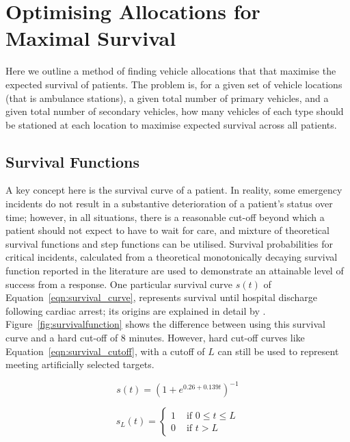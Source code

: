 \documentclass[preprint,12pt]{elsarticle}
\begin{document}
\section{Optimising Allocations for Maximal Survival}\label{sec:optimising}
Here we outline a method of finding vehicle allocations that that maximise the
expected survival of patients.
The problem is, for a given set of vehicle locations (that is ambulance
stations), a given total number of primary vehicles, and a given total number
of secondary vehicles, how many vehicles of each type should be stationed at
each location to maximise expected survival across all patients.


\subsection{Survival Functions}\label{sec:survival}
A key concept here is the survival curve of a patient.
In reality, some emergency incidents do not result in a substantive
deterioration of a patient’s status over time; however, in all situations,
there is a reasonable cut-off beyond which a patient should not expect to have
to wait for care, and mixture of theoretical survival functions and step
functions can be utilised.
Survival probabilities for critical incidents, calculated from a theoretical
monotonically decaying survival function reported in the literature
\cite{Valenzuela20001206} are used to demonstrate an attainable level of
success from a response. One particular survival curve $s(t)$ of
Equation~\ref{eqn:survival_curve}, represents survival until hospital
discharge following cardiac arrest; its origins are explained in detail by
\cite{Knight2012918}. Figure~\ref{fig:survivalfunction} shows the difference
between using this survival curve and a hard cut-off of 8 minutes.
However, hard cut-off curves like Equation~\ref{eqn:survival_cutoff}, with a
cutoff of $L$ can still be used to represent meeting artificially selected
targets.

\begin{equation}\label{eqn:survival_curve}
    s(t) = \left(1 + e^{0.26+0.139t}\right)^{-1}
\end{equation}

\begin{equation}\label{eqn:survival_cutoff}
    s_L(t) = \begin{cases}
    1 & \text{ if } 0\leq t \leq L \\
    0 & \text{ if } t > L 
    \end{cases}
\end{equation}
\end{document}
